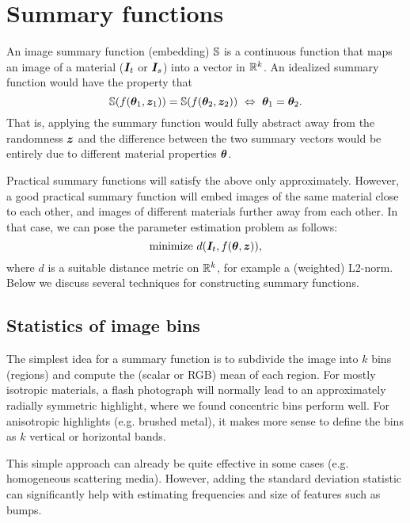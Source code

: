 \section{Summary functions}

An image summary function (embedding) $\mathbb{S}$ is a continuous function that maps an image of a material ($\bm{I}_t$ or $\bm{I}_s$) into a vector in $\mathbb{R}^k$. An idealized summary function would have the property that
\begin{equation}
	\mathbb{S}(f(\bm{\theta}_1, \bm{z}_1)) = \mathbb{S}(f(\bm{\theta}_2, \bm{z}_2)) \ \Leftrightarrow \ \bm{\theta}_1 = \bm{\theta}_2.
\end{equation}
That is, applying the summary function would fully abstract away from the randomness $\bm{z}$ and the difference between the two summary vectors would be entirely due to different material properties $\bm{\theta}$.

Practical summary functions will satisfy the above only approximately. However, a good practical summary function will embed images of the same material close to each other, and images of different materials further away from each other. In that case, we can pose the parameter estimation problem as follows:
\begin{equation}
	\mbox{minimize} \ d(\bm{I}_t, f(\bm{\theta}, \bm{z})),
\end{equation}
where $d$ is a suitable distance metric on $\mathbb{R}^k$, for example a (weighted) L2-norm. Below we discuss several techniques for constructing summary functions.



\subsection{Statistics of image bins}

The simplest idea for a summary function is to subdivide the image into $k$ bins (regions) and compute the (scalar or RGB) mean of each region. For mostly isotropic materials, a flash photograph will normally lead to an approximately radially symmetric highlight, where we found concentric bins perform well. For anisotropic highlights (e.g. brushed metal), it makes more sense to define the bins as $k$ vertical or horizontal bands.

This simple approach can already be quite effective in some cases (e.g. homogeneous scattering media). However, adding the standard deviation statistic can significantly help with estimating frequencies and size of features such as bumps.


